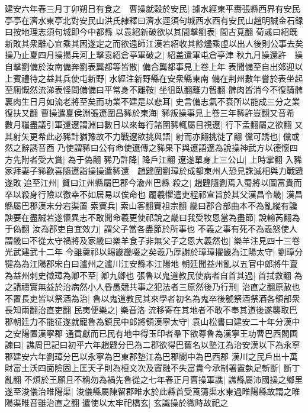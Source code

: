 建安六年春三月丁卯朔日有食之　曹操就穀於安民|{
	據水經東平夀張縣西界有安民亭亭在濟水東亭北對安民山洪氏隸釋曰濟水逕須句城西水西有安民山趙明誠金石録曰按地理志須句城即今中都縣}
以袁紹新破欲以其間擊劉表|{
	間古莧翻}
荀彧曰紹既新敗其衆離心宜乘其困遂定之而欲遠師江漢若紹收其餘燼乘虛以出人後則公事去矣操乃止夏四月操揚兵河上擊袁紹倉亭軍破之|{
	紹盖遣軍屯倉亭津}
秋九月操還許　操自擊劉備於汝南備奔劉表龔都等皆散|{
	備合龔都事見上卷上年}
表聞備至自出郊迎以上賓禮待之益其兵使屯新野|{
	水經注新野縣在安衆縣東南}
備在荆州數年嘗於表坐起至厠慨然流涕表怪問備備曰平常身不離鞍|{
	坐徂臥翻離力智翻}
髀肉皆消今不復騎髀裏肉生日月如流老將至矣而功業不建是以悲耳|{
	史言備志氣不衰所以能成三分之業復扶又翻}
曹操遣夏侯淵張遼圍昌豨於東海|{
	豨叛操事見上卷三年豨許豈翻又音希}
數月糧盡議引軍還遼謂淵曰數日以來每行諸圍豨輒屬目視遼|{
	行下孟翻屬之欲翻}
又其射矢更希此必豨計猶豫故不力戰遼欲挑與語|{
	射而亦翻挑徒了翻}
儻可誘也|{
	儻或然之辭誘音酉}
乃使謂豨曰公有命使遼傳之豨果下與遼語遼為說操神武方以德懷四方先附者受大賞|{
	為于偽翻}
豨乃許降|{
	降戶江翻}
遼遂單身上三公山|{
	上時掌翻}
入豨家拜妻子豨歡喜隨遼詣操操遣豨還　趙韙圍劉璋於成都東州人恐見誅滅相與力戰韙遂敗追至江州|{
	賢曰江州縣屬巴郡今渝州巴縣}
殺之|{
	趙韙隨劉焉入蜀將以圖富貴而卒以殺身行險以徼幸不如居易以俟命也}
龎羲懼遣吏程祁宣旨於其父漢昌令畿|{
	漢昌縣屬巴郡漢末分宕渠置}
索賨兵|{
	索山客翻賨祖宗翻}
畿曰郡合部曲本不為亂縱有讒諛要在盡誠若遂懷異志不敢聞命羲更使祁說之畿曰我受牧恩當為盡節|{
	說輸芮翻為于偽翻}
汝為郡吏自宜效力|{
	謂父子當各盡節於所事也}
不義之事有死不為羲怒使人謂畿曰不從太守禍將及家畿曰樂羊食子非無父子之恩大義然也|{
	樂羊注見四十三卷光武建武十二年}
今雖羮祁以賜畿畿啜之矣羲乃厚謝於璋璋擢畿為江陽太守|{
	劉璋分犍為為江陽郡宋白曰瀘州之瀘川江安縣本江陽地}
朝廷聞益州亂以五官中郎將牛亶為益州刺史徵璋為卿不至|{
	卿九卿也}
張魯以鬼道教民使病者自首其過|{
	首拭救翻}
為之請禱實無益於治病然小人昏愚競共事之犯法者三原然後乃行刑|{
	治直之翻原赦也}
不置長吏皆以祭酒為治|{
	魯以鬼道教民其來學者初名為鬼卒後號祭酒祭酒各領部衆長知兩翻治直吏翻}
民夷便樂之|{
	樂音洛}
流移寄在其地者不敢不奉其道後遂襲取巴郡朝廷力不能征遂就寵魯為鎮民中郎將領漢寧太守|{
	袁山松書曰建安二十年分漢中之安陽置漢寧郡}
通貢獻而已民有地中得玉印者羣下欲尊魯為漢寧王功曹巴西閻圃諫曰|{
	譙周巴記曰初平六年趙韙分巴為二郡欲得巴舊名以墊江為治安漢以下為永寧郡建安六年劉璋分巴以永寧為巴東郡墊江為巴郡閬中為巴西郡}
漢川之民戶出十萬財富土沃四面險固上匡天子則為桓文次及竇融不失富貴今承制署置埶足斬斷|{
	斷丁亂翻}
不煩於王願且不稱勿為禍先魯從之七年春正月曹操軍譙|{
	譙縣屬沛國操之鄉里}
遂至浚儀治睢陽渠|{
	浚儀縣屬陳留郡睢水於此縣首受莨蕩渠水東過睢陽縣故謂之睢陽渠睢音雖治直之翻}
遣使以太牢祀橋玄|{
	玄識操於微時故祀之}
